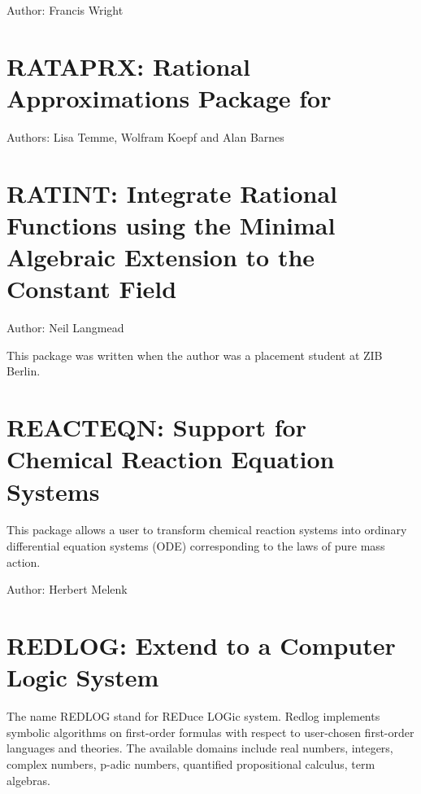 Author: Francis Wright



\newpage

\section{RATAPRX: Rational Approximations Package for \REDUCE}

Authors: Lisa Temme, Wolfram Koepf and Alan Barnes



\newpage

\section{RATINT: Integrate Rational Functions using the Minimal Algebraic                                                                                                                           Extension to the Constant Field}

Author: Neil Langmead

This package was written when the author was a placement student at ZIB Berlin.



\newpage

\section{REACTEQN: Support for Chemical Reaction Equation Systems}


This package allows a user to transform chemical reaction systems into
ordinary differential equation systems (ODE) corresponding to the laws of
pure mass action.


Author: Herbert Melenk



\newpage

\section{REDLOG: Extend \REDUCE{} to a Computer Logic System}


The name REDLOG stand for REDuce LOGic system. Redlog implements
symbolic algorithms on first-order formulas with respect to
user-chosen first-order languages and theories. The available domains
include real numbers, integers, complex numbers, p-adic numbers,
quantified propositional calculus, term algebras.

